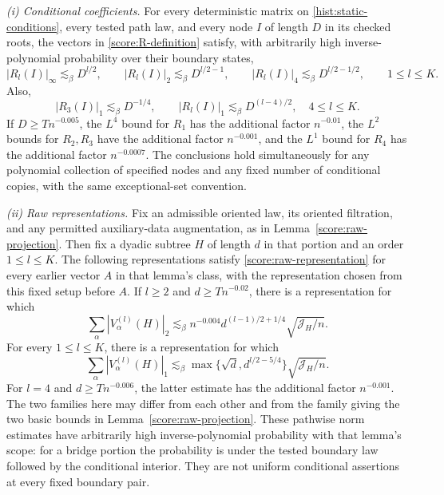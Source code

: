 \begin{proposition}\label{prop:clock-scores}
\textit{(i) Conditional coefficients.}
For every deterministic matrix on \eqref{hist:static-conditions}, every
tested path law, and every node $I$ of length $D$ in its checked roots, the
vectors in \eqref{score:R-definition} satisfy, with arbitrarily high
inverse-polynomial probability over their boundary states,
\begin{equation}\label{score:R-basic}
 |R_l(I)|_\infty\lesssim_\beta D^{l/2},\qquad
 |R_l(I)|_2\lesssim_\beta D^{l/2-1},\qquad
 |R_l(I)|_4\lesssim_\beta D^{l/2-1/2},\qquad 1\le l\le K.
\end{equation}
Also,
\begin{equation}\label{score:R-l1}
 |R_3(I)|_1\lesssim_\beta D^{-1/4},\qquad
 |R_l(I)|_1\lesssim_\beta D^{(l-4)/2},\quad 4\le l\le K.
\end{equation}
If $D\ge Tn^{-0.005}$, the $L^4$ bound for $R_1$ has the additional factor
$n^{-0.01}$, the $L^2$ bounds for $R_2,R_3$ have the additional factor
$n^{-0.001}$, and the $L^1$ bound for $R_4$ has the additional factor
$n^{-0.0007}$.  The conclusions hold simultaneously for any polynomial
collection of specified nodes and any fixed number of conditional copies,
with the same exceptional-set convention.

\textit{(ii) Raw representations.}
Fix an admissible oriented law, its oriented filtration, and any permitted
auxiliary-data augmentation, as in Lemma~\ref{score:raw-projection}.  Then
fix a dyadic subtree $H$ of length $d$ in that portion and an order
$1\le l\le K$.  The following representations satisfy
\eqref{score:raw-representation} for every earlier vector $A$ in that
lemma's class, with the representation chosen from this fixed setup before
$A$.  If $l\ge2$ and $d\ge Tn^{-0.02}$, there is a representation for which
\begin{equation}\label{score:raw-improvement}
 \sum_\alpha|V_\alpha^{(l)}(H)|_2
       \lesssim_\beta n^{-0.004}
                   d^{(l-1)/2+1/4}\sqrt{\mathcal J_H/n}.
\end{equation}
For every $1\le l\le K$, there is a representation for which
\begin{equation}\label{score:raw-l1-projection}
 \sum_\alpha|V_\alpha^{(l)}(H)|_1
       \lesssim_\beta \max\{\sqrt d,d^{l/2-5/4}\}\sqrt{\mathcal J_H/n}.
\end{equation}
For $l=4$ and $d\ge Tn^{-0.006}$, the latter estimate has the additional
factor $n^{-0.001}$.  The two families here may differ from each other and
from the family giving the two basic bounds in Lemma~\ref{score:raw-projection}.
These pathwise norm estimates have arbitrarily high inverse-polynomial
probability with that lemma's scope: for a bridge portion the probability
is under the tested boundary law followed by the conditional interior.
They are not uniform conditional assertions at every fixed boundary pair.
\end{proposition}

